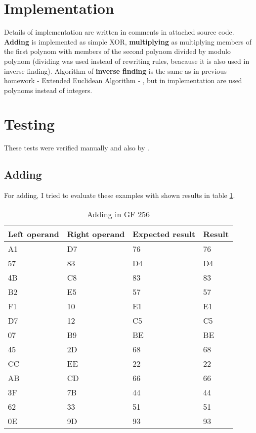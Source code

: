 \documentclass[5pt]{article}
\begin{document}
\maketitle

\section{Implementation}
Details of implementation are written in comments in attached source code.
\textbf{Adding} is implemented as simple XOR, \textbf{multiplying} as
multiplying members of the first polynom with members of the second polynom
divided by modulo polynom (dividing was used instead of rewriting rules, beacause it is also
used in inverse finding). Algorithm of \textbf{inverse finding} is
the same as in previous homework - Extended Euclidean Algorithm - , but in
implementation are used polynoms instead of integers.

\section{Testing}
These tests were verified manually and also by \cite{gf256:web}.
\subsection{Adding}
For adding, I tried to evaluate these examples with shown results in
table \ref{tab:adding}.

\begin{table}[ht]
  \centering
  \caption{Adding in GF 256}
  \begin{tabular}{|l|l|l|l|}
  \hline
  Left operand & Right operand & Expected result & Result\\
  \hline
  \hline
  
  A1 & D7 & 76 & 76 \\
  \hline
57 & 83 & D4 & D4\\
\hline
4B & C8 & 83 & 83\\
\hline
B2 & E5 & 57 & 57 \\
\hline
F1 & 10 &  E1 & E1\\
\hline 	
D7 & 12 & C5 & C5 \\
\hline 	
07& B9 & BE &	BE\\
\hline 	
45& 2D & 68 &	68\\
\hline 	
CC& EE & 22 &	22\\
\hline
AB & CD & 66 & 66 \\
\hline 	
3F& 7B & 44 &	44\\
\hline 	
62& 33 & 51 &	51\\
\hline 	
0E& 9D & 93 &	93\\
\hline


  \end{tabular}
  \label{tab:adding}
\end{table}
\end{document}
